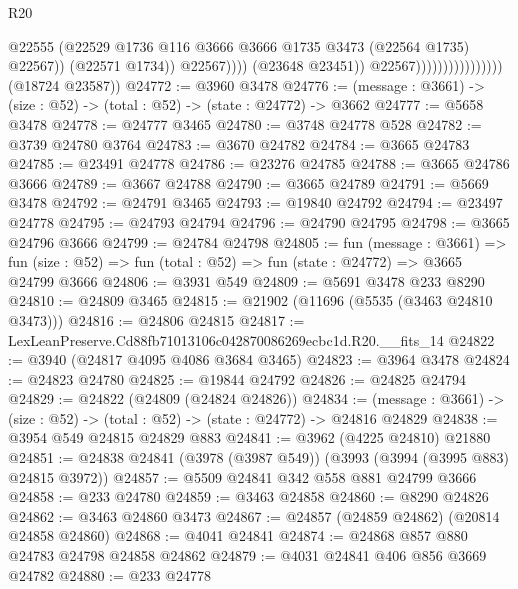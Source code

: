 \begin{lexlean}{R20}
\begin{coremodule}
                                                    @22555
                                                    (@22529
                                                      @1736
                                                      @116
                                                      @3666
                                                      @3666
                                                      @1735
                                                      @3473
                                                      (@22564 @1735)
                                                      @22567))
                                                  (@22571 @1734))
                                                @22567))))
                                        (@23648 @23451))
                                      @22567))))))))))))))))
      (@18724 @23587))
@24772 := @3960 @3478
@24776 := (message : @3661) -> (size : @52) -> (total : @52) -> (state : @24772) -> @3662
@24777 := @5658 @3478
@24778 := @24777 @3465
@24780 := @3748 @24778 @528
@24782 := @3739 @24780 @3764
@24783 := @3670 @24782
@24784 := @3665 @24783
@24785 := @23491 @24778
@24786 := @23276 @24785
@24788 := @3665 @24786 @3666
@24789 := @3667 @24788
@24790 := @3665 @24789
@24791 := @5669 @3478
@24792 := @24791 @3465
@24793 := @19840 @24792
@24794 := @23497 @24778
@24795 := @24793 @24794
@24796 := @24790 @24795
@24798 := @3665 @24796 @3666
@24799 := @24784 @24798
@24805 := fun (message : @3661) =>
  fun (size : @52) => fun (total : @52) => fun (state : @24772) => @3665 @24799 @3666
@24806 := @3931 @549
@24809 := @5691 @3478 @233 @8290
@24810 := @24809 @3465
@24815 := @21902 (@11696 (@5535 (@3463 @24810 @3473)))
@24816 := @24806 @24815
@24817 := LexLeanPreserve.Cd88fb71013106c042870086269ecbc1d.R20.__fits_14
@24822 := @3940 (@24817 @4095 @4086 @3684 @3465)
@24823 := @3964 @3478
@24824 := @24823 @24780
@24825 := @19844 @24792
@24826 := @24825 @24794
@24829 := @24822 (@24809 (@24824 @24826))
@24834 := (message : @3661) -> (size : @52) -> (total : @52) -> (state : @24772) -> @24816 @24829
@24838 := @3954 @549 @24815 @24829 @883
@24841 := @3962 (@4225 @24810) @21880
@24851 := @24838 @24841 (@3978 (@3987 @549)) (@3993 (@3994 (@3995 @883) @24815 @3972))
@24857 := @5509 @24841 @342 @558 @881 @24799 @3666
@24858 := @233 @24780
@24859 := @3463 @24858
@24860 := @8290 @24826
@24862 := @3463 @24860 @3473
@24867 := @24857 (@24859 @24862) (@20814 @24858 @24860)
@24868 := @4041 @24841
@24874 := @24868 @857 @880 @24783 @24798 @24858 @24862
@24879 := @4031 @24841 @406 @856 @3669 @24782
@24880 := @233 @24778

\end{coremodule}
\end{lexlean}
